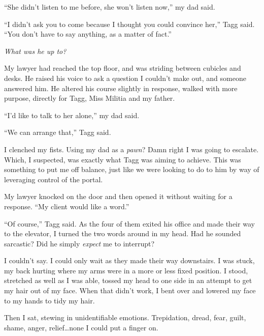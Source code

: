 ``She didn't listen to me before, she won't listen now,'' my dad said.



``I didn't ask you to come because I thought you could convince her,'' Tagg said.  ``You don't have to say anything, as a matter of fact.''



\emph{What was he up to?}



My lawyer had reached the top floor, and was striding between cubicles and desks.  He raised his voice to ask a question I couldn't make out, and someone answered him.  He altered his course slightly in response, walked with more purpose, directly for Tagg, Miss Militia and my father.



``I'd like to talk to her alone,'' my dad said.



``We can arrange that,'' Tagg said.



I clenched my fists.  Using my dad as a \emph{pawn}?  Damn right I was going to escalate.  Which, I suspected, was exactly what Tagg was aiming to achieve.  This was something to put me off balance, just like we were looking to do to him by way of leveraging control of the portal.



My lawyer knocked on the door and then opened it without waiting for a response.  ``My client would like a word.''



``Of course,'' Tagg said.  As the four of them exited his office and made their way to the elevator, I turned the two words around in my head.  Had he sounded sarcastic?  Did he simply \emph{expect} me to interrupt?



I couldn't say.  I could only wait as they made their way downstairs.  I was stuck, my back hurting where my arms were in a more or less fixed position.  I stood, stretched as well as I was able, tossed my head to one side in an attempt to get my hair out of my face.  When that didn't work, I bent over and lowered my face to my hands to tidy my hair.



Then I sat, stewing in unidentifiable emotions.  Trepidation, dread, fear, guilt, shame, anger, relief\ldots none I could put a finger on.



